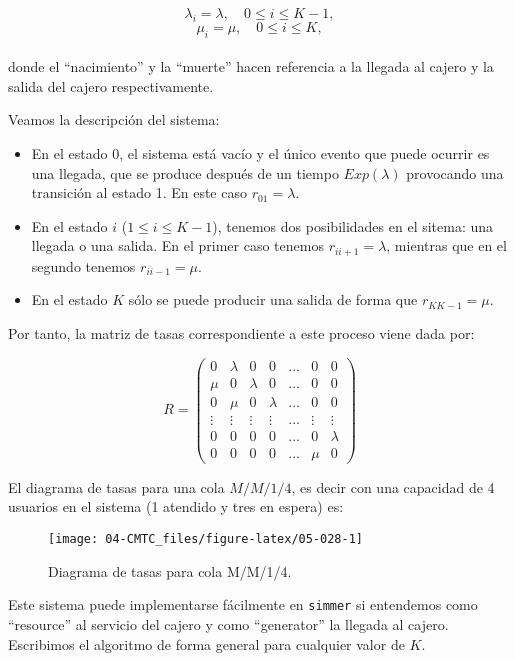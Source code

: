 \documentclass[
]{book}
\theoremstyle{definition}
\theoremstyle{definition}
\theoremstyle{definition}
\theoremstyle{definition}
\theoremstyle{remark}
\begin{document}
\[\lambda_i = \lambda, \quad 0 \leq i \leq K-1,\] \[\mu_i = \mu, \quad 0 \leq i \leq K,\]\\
donde el ``nacimiento'' y la ``muerte'' hacen referencia a la llegada al cajero y la salida del cajero respectivamente.

Veamos la descripción del sistema:

\begin{itemize}
\item
  En el estado 0, el sistema está vacío y el único evento que puede ocurrir es una llegada, que se produce después de un tiempo \(Exp(\lambda)\) provocando una transición al estado 1. En este caso \(r_{01} = \lambda\).
\item
  En el estado \(i\) (\(1 \leq i \leq K-1\)), tenemos dos posibilidades en el sitema: una llegada o una salida. En el primer caso tenemos \(r_{i i+1} = \lambda\), mientras que en el segundo tenemos \(r_{i i-1} = \mu\).
\item
  En el estado \(K\) sólo se puede producir una salida de forma que \(r_{K K-1} = \mu\).
\end{itemize}

Por tanto, la matriz de tasas correspondiente a este proceso viene dada por:

\[R = 
\begin{pmatrix}
0 & \lambda & 0 & 0 & \ldots & 0 & 0 \\
\mu & 0 & \lambda & 0 & \ldots & 0 & 0 \\
0 & \mu & 0 & \lambda & \ldots & 0 & 0 \\
\vdots & \vdots & \vdots & \vdots & \ldots & \vdots & \vdots \\
0 & 0 & 0 & 0 & \ldots & 0 & \lambda \\
0 & 0 & 0 & 0 & \ldots &\mu & 0
\end{pmatrix} \]

El diagrama de tasas para una cola \(M/M/1/4\), es decir con una capacidad de 4 usuarios en el sistema (1 atendido y tres en espera) es:

\begin{figure}

{\centering \texttt{[image: 04-CMTC\_files/figure-latex/05-028-1]} 

}

\caption{Diagrama de tasas para cola M/M/1/4.}\label{fig:05-028}
\end{figure}

Este sistema puede implementarse fácilmente en \texttt{simmer} si entendemos como ``resource'' al servicio del cajero y como ``generator'' la llegada al cajero. Escribimos el algoritmo de forma general para cualquier valor de \(K\).
\end{document}
